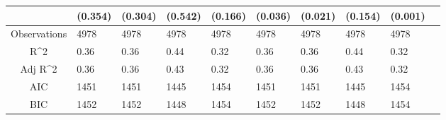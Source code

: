 \documentclass{article}
\begin{document}
\begin{table}[H]
\begin{tabular}{|clllllllll|}
   & (0.354) & (0.304) & (0.542) & (0.166) & (0.036) & (0.021) & (0.154) & (0.001) & \\ 
  \hline 
 Observations & 4978 & 4978 & 4978 & 4978 & 4978 & 4978 & 4978 & 4978 & \\ 
  R^2 & 0.36 & 0.36 & 0.44 & 0.32 & 0.36 & 0.36 & 0.44 & 0.32 & \\ 
  Adj R^2 & 0.36 & 0.36 & 0.43 & 0.32 & 0.36 & 0.36 & 0.43 & 0.32 & \\ 
  AIC & 1451 & 1451 & 1445 & 1454 & 1451 & 1451 & 1445 & 1454 & \\ 
  BIC & 1452 & 1452 & 1448 & 1454 & 1452 & 1452 & 1448 & 1454 & \\ 
   \hline
\end{tabular}
 
\end{table}
\end{document}
